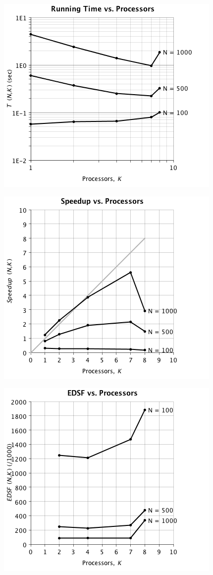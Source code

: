 \documentclass{dependencies/acm_proc_article-sp}
\begin{document}
\begin{center}
\includegraphics[scale=0.5]{images/matrix-inversion/running-vs-proc.png}
\end{center}
\begin{center}
\includegraphics[scale=0.5]{images/matrix-inversion/speedup-vs-proc.png}
\end{center}
\begin{center}
\includegraphics[scale=0.5]{images/matrix-inversion/edsf-vs-proc.png}
\end{center}
\end{document}
